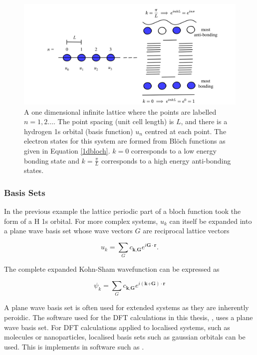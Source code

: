 \begin{figure}[h]
\centering
  \includegraphics[width=1.0\columnwidth]{figures/ch3/bands.png}
  \caption[Bonding and anti-bonding states in an infinite 1D crystal]{A one dimensional infinite lattice where the points are labelled $n=1,2\ldots$. The point spacing (unit cell length) is $L$, and there is a hydrogen 1s orbital (basis function) $u_n$ centred at each point. The electron states for this system are formed from Bl\"{o}ch functions as given in Equation \ref{1dbloch}. $k=0$ corresponds to a low energy bonding state and $k=\frac{\pi}{L}$ corresponds to a high energy anti-bonding states.} 
  \label{bands}
\end{figure}

\subsubsection{Basis Sets}   %

In the previous example the lattice periodic part of a bloch function took the form of a H 1s orbital. For more complex systems, $u_k$ can itself be expanded into a plane wave basis set whose wave vectors $G$ are reciprocal lattice vectors

\begin{equation}
u_k = \sum_Gc_{\textbf{k},\textbf{G}}e^{i\textbf{G}\cdot\textbf{r}}.
\end{equation}

The complete expanded Kohn-Sham wavefunction can be expressed as

\begin{equation} \label{KSeigenstates}
\psi_k = \sum_Gc_{\textbf{k},\textbf{G}}e^{i(\textbf{k+G})\cdot\textbf{r}}
\end{equation}

A plane wave basis set is often used for extended systems as they are inherently peroidic. The software used for the DFT calculations in this thesis, \autocite{}, uses a plane wave basis set. For DFT calculations applied to localised systems, such as molecules or nanoparticles, localised basis sets such as gaussian orbitals can be used. This is implements in software such as \autcite{}.

